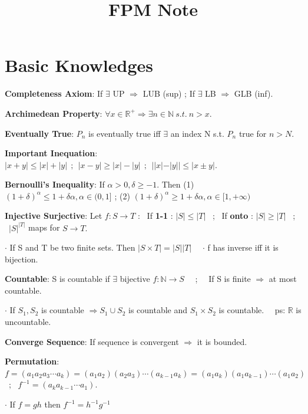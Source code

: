 \documentclass[11pt]{article}
\title{FPM Note}
\author{}
\date{}
\begin{document}
\maketitle
\thispagestyle{fancy}
\vspace{-3.5cm}

\fontsize{11pt}{13pt}\selectfont
\setlength{\parindent}{8pt}

\section{Basic Knowledges} %

\textbf{Completeness Axiom}: If $\exists$ UP $\Rightarrow$ LUB (sup) ; If $\exists$ LB $\Rightarrow$ GLB (inf).

\textbf{Archimedean Property}: $\forall x \in \mathbb{R}^+ \Rightarrow \exists n\in \mathbb{N} \ s.t. \ n>x.$

\textbf{Eventually True}: $P_n$ is eventually true iff $\exists$ an index N s.t. $P_n$ true for $n>N.$

\textbf{Important Inequation}: $|x+y|\leq|x|+|y| \ \ ; \ \ |x-y|\geq|x|-|y| \ \ ; \ \ ||x|-|y|| \leq|x \pm y|.$

\textbf{Bernoulli's Inequality}: If $\alpha>0,\delta\geq-1$. Then (1) $(1+\delta)^\alpha\leq 1+\delta\alpha,\alpha\in(0,1]$ ; (2) $(1+\delta)^\alpha\geq 1+\delta\alpha,\alpha\in[1,+\infty)$

\textbf{Injective Surjective}: Let $f:S \rightarrow T$ : \ If \textbf{1-1} : $|S|\leq|T|$ \ ; \ If \textbf{onto} : $|S|\geq|T|$ \ ; \ $|S|^{|T|}$ maps for $S \rightarrow T.$

$\cdot$ If S and T be two finite sets. Then $|S \times T|=|S||T|$ \ \ $\cdot$ f has inverse iff it is bijection.

\textbf{Countable}: S is countable if $\exists $ bijective $f:\mathbb{N}\rightarrow S$ \ \ ; \ \ If S is finite $\Rightarrow$ at most countable.

$\cdot$ If $S_1,S_2$ is countable $\Rightarrow S_1 \cup S_2$ is countable and $S_1 \times S_2$ is countable. \ \ ps: $\mathbb{R}$ is uncountable.

\textbf{Converge Sequence}: If sequence is convergent $\Rightarrow$ it is bounded.

\textbf{Permutation}: $f=(a_1a_2a_3\cdots a_k)=(a_1a_2)(a_2a_3)\cdots(a_{k-1}a_k)=(a_1a_k)(a_1a_{k-1})\cdots(a_1a_2)$ \ ; \ $f^{-1}=(a_{k}a_{k-1}\cdots a_1).$

$\cdot$ If $f=gh$ then $f^{-1}=h^{-1}g^{-1}$
\end{document}
